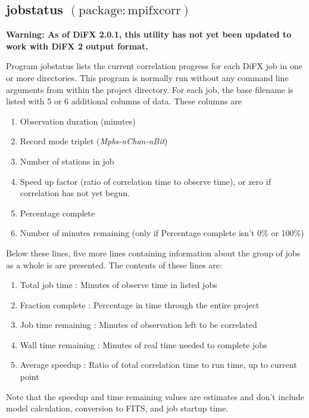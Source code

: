 
\subsection{jobstatus {\small $\mathrm{(package: mpifxcorr)}$}} \label{sec:jobstatus}

\noindent
{\bf Warning: As of DiFX 2.0.1, this utility has not yet been updated to work with DiFX 2 output format.}

\noindent
Program jobstatus lists the current correlation progress for each DiFX job in one or more directories.
This program is normally run without any command line arguments from within the project directory.
For each job, the base filename is listed with 5 or 6 additional columns of data.
These columns are
\begin{enumerate}
\item Observation duration (minutes)
\item Record mode triplet ({\em Mpbs-nChan-nBit})
\item Number of stations in job
\item Speed up factor (ratio of correlation time to observe time), or zero if correlation has not yet begun.
\item Percentage complete
\item Number of minutes remaining (only if Percentage complete isn't 0\% or 100\%)
\end{enumerate}
Below these lines, five more lines containing information about the group of jobs as a whole is are presented.
The contents of these lines are:
\begin{enumerate}
\item Total job time : Minutes of observe time in listed jobs
\item Fraction complete : Percentage in time through the entire project
\item Job time remaining : Minutes of observation left to be correlated
\item Wall time remaining : Minutes of real time needed to complete jobs
\item Average speedup : Ratio of total correlation time to run time, up to current point
\end{enumerate}
Note that the speedup and time remaining values are estimates and don't include model calculation, conversion to FITS, and job startup time.

